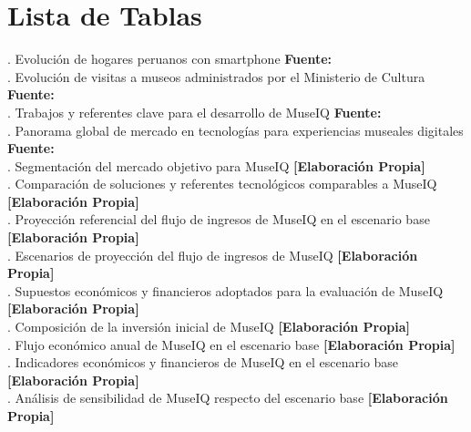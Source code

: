 \chapter*{Lista de Tablas}

. Evolución de hogares peruanos con smartphone \textbf{Fuente:} \cite{osiptel2021smartphone,osiptel2022smartphone,osiptel2023smartphone,osiptel2024smartphone} \\
. Evolución de visitas a museos administrados por el Ministerio de Cultura \textbf{Fuente:} \cite{culturapesem2021,cultura2020memoria,cultura2022memoria,cultura2023memoria,cultura2024reporte} \\
. Trabajos y referentes clave para el desarrollo de MuseIQ \textbf{Fuente:} \cite{verde2023blemuseum,wang2024voiceguide,ivanov2025smartmuseums,bloomberg2025connects} \\[0.2cm]

. Panorama global de mercado en tecnologías para experiencias museales digitales \textbf{Fuente:} \cite{htf2025digital,grandview2024art,grandview2024hardware,grandview2024software,grandview2024services} \\[0.2cm]

. Segmentación del mercado objetivo para MuseIQ \textbf{[Elaboración Propia]} \\[0.2cm]

. Comparación de soluciones y referentes tecnológicos comparables a MuseIQ \textbf{[Elaboración Propia]} \\[0.2cm]

. Proyección referencial del flujo de ingresos de MuseIQ en el escenario base \textbf{[Elaboración Propia]} \\
. Escenarios de proyección del flujo de ingresos de MuseIQ \textbf{[Elaboración Propia]} \\[0.2cm]

. Supuestos económicos y financieros adoptados para la evaluación de MuseIQ \textbf{[Elaboración Propia]} \\
. Composición de la inversión inicial de MuseIQ \textbf{[Elaboración Propia]} \\
. Flujo económico anual de MuseIQ en el escenario base \textbf{[Elaboración Propia]} \\
. Indicadores económicos y financieros de MuseIQ en el escenario base \textbf{[Elaboración Propia]} \\
. Análisis de sensibilidad de MuseIQ respecto del escenario base \textbf{[Elaboración Propia]} 

\cleardoublepage
